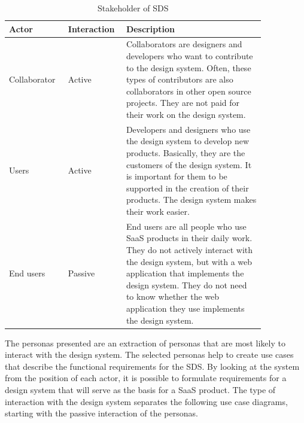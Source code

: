 \begin{table}[!ht]
    \begin{tabular}{|p{0.2\linewidth} | p{0.15\linewidth}| p{0.5\linewidth}|}
    \hline
     \textbf{Actor} &\textbf{Interaction} & \textbf{Description} \\ \hline
     Collaborator & Active & Collaborators are designers and developers who want to contribute to the design system. Often, these types of contributors are also collaborators in other open source projects. They are not paid for their work on the design system.  \\ \hline
     Users & Active & Developers and designers who use the design system to develop new products. Basically, they are the customers of the design system. It is important for them to be supported in the creation of their products. The design system makes their work easier.  \\ \hline
     End users & Passive & End users are all people who use \ac{SaaS} products in their daily work. They do not actively interact with the design system, but with a web application that implements the design system. They do not need to know whether the web application they use implements the design system. \\ \hline
     
    \end{tabular}
    \caption{\label{tab:stakeholders_sds} Stakeholder of \ac{SDS}}
\end{table}
The personas presented are an extraction of personas that are most likely to interact with the design system. The selected personas help to create use cases that describe the functional requirements for the \ac{SDS}. By looking at the system from the position of each actor, it is possible to formulate requirements for a design system that will serve as the basis for a \ac{SaaS} product. The type of interaction with the design system separates the following use case diagrams, starting with the passive interaction of the personas. \\

